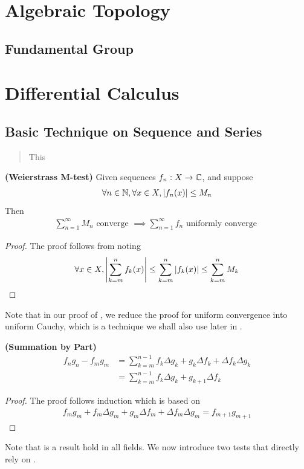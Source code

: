 \documentclass{report}
\begin{document}
\chapter{Algebraic Topology}
\section{Fundamental Group}
\chapter{Differential Calculus}
\section{Basic Technique on Sequence and Series}
\begin{abstract}
This 
\end{abstract}
\begin{theorem}
\label{WM-t}
\textbf{(Weierstrass M-test)} Given sequences $f_n:X\rightarrow \mathbb{C}$, and suppose 
\begin{align*}
\forall n\in\mathbb{N},\forall x\in X, \left|f_n(x)\right|\leq M_n
\end{align*}
Then 
\begin{align*}
\sum_{n=1}^\infty M_n\text{ converge }\implies \sum_{n=1}^\infty f_n\text{ uniformly converge }
\end{align*} 
\end{theorem}
\begin{proof}
The proof follows from noting 
\begin{align*}
  \forall x\in X, \left|\sum_{k=m}^n f_k(x)\right|\leq \sum_{k=m}^n \left|f_k(x)\right|\leq \sum_{k=m}^n M_k
\end{align*}
\end{proof}
\begin{mdframed}
Note that in our proof of  , we reduce the proof for uniform convergence into uniform Cauchy, which is a technique we shall also use later in .
\end{mdframed}
\begin{theorem}
\label{Summation by Part}
\textbf{(Summation by Part)} 
\begin{align*}
  f_ng_n-f_mg_m&=\sum_{k=m}^{n-1}f_k \Delta g_k + g_k \Delta f_k+ \Delta f_k \Delta g_k \\
  &=\sum_{k=m}^{n-1}f_k \Delta g_k + g_{k+1}\Delta f_k
\end{align*}
\end{theorem}
\begin{proof}
The proof follows induction which is based on 
\begin{align*}
f_mg_m+ f_m\Delta g_m+ g_m \Delta f_m +\Delta f_m \Delta g_m=f_{m+1}g_{m+1}
\end{align*} 
\end{proof}
\begin{mdframed}
Note that  is a result hold in all fields. We now introduce two tests that directly rely on . 
\end{mdframed}
\end{document}
